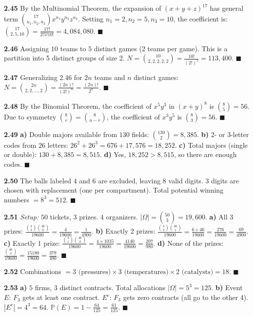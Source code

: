 \documentclass[11pt]{article}
\theoremstyle{definition}
\begin{document}
\textbf{2.45} 
By the Multinomial Theorem, the expansion of $(x+y+z)^{17}$ has general term $\binom{17}{n_1, n_2, n_3} x^{n_1} y^{n_2} z^{n_3}$. Setting $n_1=2, n_2=5, n_3=10$, the coefficient is:
$\binom{17}{2, 5, 10} = \frac{17!}{2! 5! 10!} = 4,084,080$. $\blacksquare$

\textbf{2.46} 
Assigning $10$ teams to $5$ distinct games (2 teams per game). This is a partition into 5 distinct groups of size 2.
$N = \binom{10}{2, 2, 2, 2, 2} = \frac{10!}{(2!)^5} = 113,400$. $\blacksquare$

\textbf{2.47} 
Generalizing 2.46 for $2n$ teams and $n$ distinct games:
$N = \binom{2n}{2, 2, \dots, 2} = \frac{(2n)!}{(2!)^n} = \frac{(2n)!}{2^n}$. $\blacksquare$

\textbf{2.48} 
By the Binomial Theorem, the coefficient of $x^5 y^3$ in $(x+y)^8$ is $\binom{8}{5} = 56$. Due to symmetry $\binom{8}{r} = \binom{8}{n-r}$, the coefficient of $x^3 y^5$ is $\binom{8}{3} = 56$. $\blacksquare$

\textbf{2.49} 
\textbf{a)} Double majors available from $130$ fields: $\binom{130}{2} = 8,385$.
\textbf{b)} 2- or 3-letter codes from $26$ letters: $26^2 + 26^3 = 676 + 17,576 = 18,252$.
\textbf{c)} Total majors (single or double): $130 + 8,385 = 8,515$.
\textbf{d)} Yes, $18,252 > 8,515$, so there are enough codes. $\blacksquare$

\textbf{2.50} 
The balls labeled $4$ and $6$ are excluded, leaving $8$ valid digits. 3 digits are chosen with replacement (one per compartment). Total potential winning numbers $= 8^3 = 512$. $\blacksquare$

\textbf{2.51} 
\textit{Setup:} $50$ tickets, $3$ prizes. $4$ organizers. $|\Omega| = \binom{50}{3} = 19,600$.
\textbf{a)} All 3 prizes: $\frac{\binom{4}{3} \binom{46}{0}}{19600} = \frac{4}{19600} = \frac{1}{4900}$.
\textbf{b)} Exactly 2 prizes: $\frac{\binom{4}{2} \binom{46}{1}}{19600} = \frac{6 \times 46}{19600} = \frac{276}{19600} = \frac{69}{4900}$.
\textbf{c)} Exactly 1 prize: $\frac{\binom{4}{1} \binom{46}{2}}{19600} = \frac{4 \times 1035}{19600} = \frac{4140}{19600} = \frac{207}{980}$.
\textbf{d)} None of the prizes: $\frac{\binom{46}{3}}{19600} = \frac{15180}{19600} = \frac{379}{490}$. $\blacksquare$

\textbf{2.52} 
Combinations $= 3 \text{ (pressures)} \times 3 \text{ (temperatures)} \times 2 \text{ (catalysts)} = 18$. $\blacksquare$

\textbf{2.53} 
\textbf{a)} $5$ firms, $3$ distinct contracts. Total allocations $|\Omega| = 5^3 = 125$.
\textbf{b)} Event $E$: $F_3$ gets at least one contract. $E^c$: $F_3$ gets zero contracts (all go to the other 4). $|E^c| = 4^3 = 64$.
$\mathbb{P}(E) = 1 - \frac{64}{125} = \frac{61}{125}$. $\blacksquare$
\end{document}
